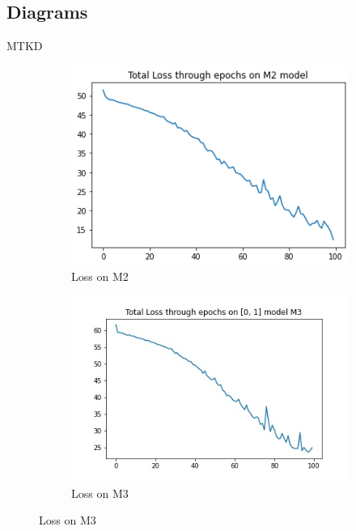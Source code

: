 \documentclass [xcolor=svgnames, t] {beamer}
\begin{document}
\subsection{Diagrams}
\begin{frame}{MTKD}
    \centering
\begin{figure}
\centering
\begin{minipage}{.5\textwidth}
  \centering
  \vspace{10mm}
  \begin{figure}[H]
  \includegraphics[width=0.9\linewidth]{M2_loss.png}
  \caption{Loss on M2}
  \end{figure}
\end{minipage}%
\begin{minipage}{.5\textwidth}
  \centering
  \vspace{10mm}
  \begin{figure}[H]
  \includegraphics[width=1.1\linewidth]{M3_loss.jpg}
  \caption{Loss on M3}
  \end{figure}
\end{minipage}
\end{figure}
\end{frame}
\end{document}
